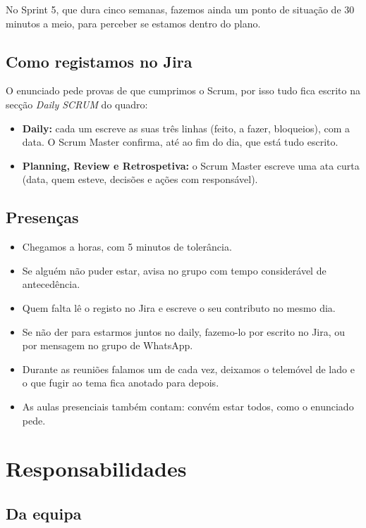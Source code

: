 \documentclass[11pt,a4paper]{article}
\begin{document}
No Sprint 5, que dura cinco semanas, fazemos ainda um ponto de situação de 30 minutos a meio, para perceber se estamos dentro do plano.

\subsection{Como registamos no Jira}

O enunciado pede provas de que cumprimos o Scrum, por isso tudo fica escrito na secção \textit{Daily SCRUM} do quadro:

\begin{itemize}
  \item \textbf{Daily:} cada um escreve as suas três linhas (feito, a fazer, bloqueios), com a data. O Scrum Master confirma, até ao fim do dia, que está tudo escrito.
  \item \textbf{Planning, Review e Retrospetiva:} o Scrum Master escreve uma ata curta (data, quem esteve, decisões e ações com responsável).
\end{itemize}

\subsection{Presenças}

\begin{itemize}
  \item Chegamos a horas, com 5 minutos de tolerância.
  \item Se alguém não puder estar, avisa no grupo com tempo considerável de antecedência.
  \item Quem falta lê o registo no Jira e escreve o seu contributo no mesmo dia.
  \item Se não der para estarmos juntos no daily, fazemo-lo por escrito no Jira, ou por mensagem no grupo de WhatsApp.
  \item Durante as reuniões falamos um de cada vez, deixamos o telemóvel de lado e o que fugir ao tema fica anotado para depois.
  \item As aulas presenciais também contam: convém estar todos, como o enunciado pede.
\end{itemize}

\section{Responsabilidades}

\subsection{Da equipa}
\end{document}
